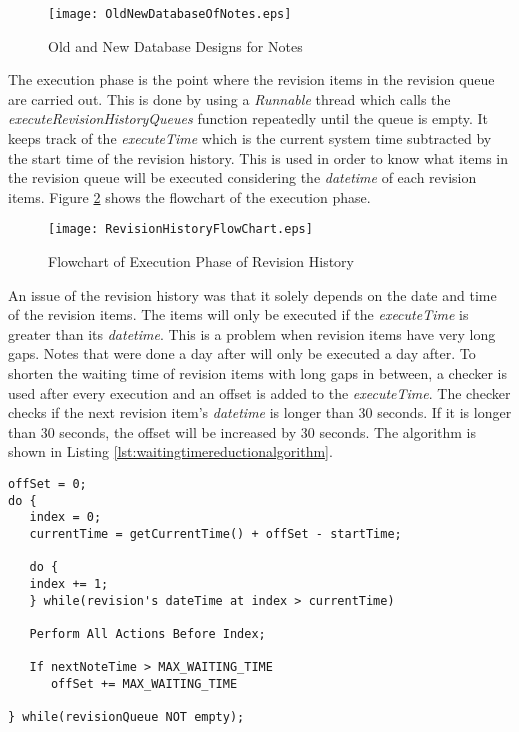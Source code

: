 \begin{figure}[htbp!]
   \centering    
   \texttt{[image: OldNewDatabaseOfNotes.eps]}
   \caption{Old and New Database Designs for Notes}
   \label{fig:oldnewdatabasefornotes}
\end{figure}

The execution phase is the point where the revision items in the revision queue are carried out. This is done by using a \textit{Runnable} thread which calls the \textit{executeRevisionHistoryQueues} function repeatedly until the queue is empty. It keeps track of the \textit{executeTime} which is the current system time subtracted by the start time of the revision history. This is used in order to know what items in the revision queue will be executed considering the \textit{datetime} of each revision items. Figure \ref{fig:revisionhistoryflowchart} shows the flowchart of the execution phase.

\begin{figure}[htbp!]          
   \centering                 
   \texttt{[image: RevisionHistoryFlowChart.eps]}   
   \caption{Flowchart of Execution Phase of Revision History}
   \label{fig:revisionhistoryflowchart}
\end{figure}

An issue of the revision history was that it solely depends on the date and time of the revision items. The items will only be executed if the \textit{executeTime} is greater than its \textit{datetime}. This is a problem when revision items have very long gaps. Notes that were done a day after will only be executed a day after. To shorten the waiting time of revision items with long gaps in between, a checker is used after every execution and an offset is added to the \textit{executeTime}. The checker checks if the next revision item's \textit{datetime} is longer than 30 seconds. If it is longer than 30 seconds, the offset will be increased by 30 seconds. The algorithm is shown in Listing \ref{lst:waitingtimereductionalgorithm}.

\begin{lstlisting}[frame=single, label=lst:waitingtimereductionalgorithm, caption=Algorithm for Reduction of Waiting Time during Revision History]
offSet = 0;
do {
   index = 0; 
   currentTime = getCurrentTime() + offSet - startTime;

   do {
   index += 1;
   } while(revision's dateTime at index > currentTime)

   Perform All Actions Before Index;

   If nextNoteTime > MAX_WAITING_TIME
      offSet += MAX_WAITING_TIME

} while(revisionQueue NOT empty);
\end{lstlisting}

